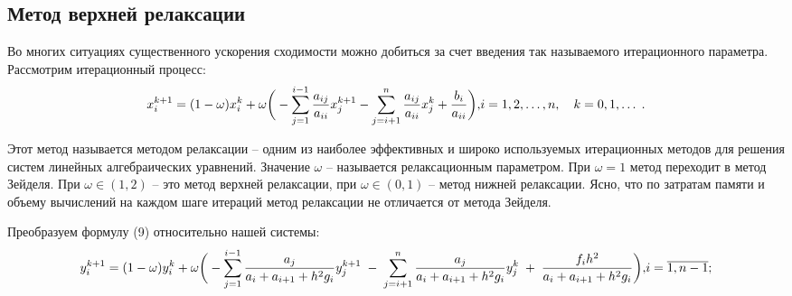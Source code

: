 \documentclass[a4paper,12pt]{article}
\begin{document}
{\subsection{Метод верхней релаксации}
\hspace{1.25cm}Во многих ситуациях существенного ускорения сходимости можно добиться за счет введения так называемого итерационного параметра. 
Рассмотрим итерационный процесс:
\begin{equation}
    x_i^{k+1}=(1-\omega)x_i^k+\omega \bigg( - \sum\limits_{j=1}^{i-1} \frac{a_{ij}}{a_{ii}}x_j^{k+1}- \sum\limits_{j=i+1}^{n} \frac{a_{ij}}{a_{ii}}x_j^{k}+\frac{b_i}{a_{ii}}\bigg),
    $$$$ i=1,2, \dots, n, \quad k=0,1, \dots \; .
    \label{9}
\end{equation}

Этот метод называется методом релаксации -- одним из наиболее эффективных и широко используемых итерационных 
методов для решения систем линейных алгебраичес\-ких уравнений. Значение $\omega $ -- называется релаксационным параметром. 
При $\omega = 1$ метод переходит в метод Зейделя. При $\omega \in (1,2)$ -- это метод верхней релаксации, при $\omega \in (0,1)$ -- метод нижней релаксации. 
Ясно, что по затратам памяти и объему вычислений на каждом шаге итераций метод релаксации не отличается от метода Зейделя.

Преобразуем формулу (9) относительно нашей системы:
\begin{equation}
    y_i^{k+1}=(1-\omega)y_i^k+\omega  \bigg(-\sum\limits_{j=1}^{i-1}\frac{a_j}{a_i+a_{i+1}+h^2 g_i}y_j^{k+1} \; - \;\sum\limits_{j=i+1}^{n}\frac{a_{j}}{a_i+a_{i+1}+h^2 g_i}y_j^k\; +\; \frac{f_i h^2}{a_i+a_{i+1}+h^2 g_i}\bigg),$$$$
    i=\overline{1, n-1};
    \label{10}
\end{equation}

}
\end{document}
